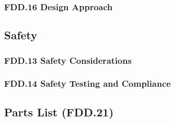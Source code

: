 \subsubsection{FDD.16 Design Approach}
 
\subsection{Safety}
\subsubsection{FDD.13 Safety Considerations}
 
\subsubsection{FDD.14 Safety Testing and Compliance}
 
\subsection{Parts List (FDD.21)}

\newpage